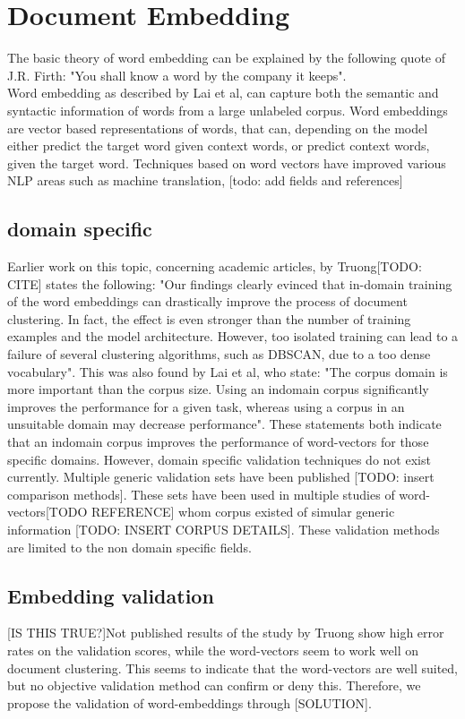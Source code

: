 \documentclass[../../Thesis.tex]{subfiles}
\begin{document}
\section{Document Embedding}
The basic theory of word embedding can be explained by the following quote of J.R. Firth: "You shall know a word by the company it keeps". \\
Word embedding as described by Lai et al, can capture both the semantic and syntactic
information of words from a large unlabeled corpus.\cite{lai2016generate} Word embeddings are vector based representations of words, that can, depending on the model either predict the target word given context words, or predict context words, given the target word. Techniques based on word vectors have improved various NLP areas such as machine translation, [todo: add fields and references]

\subsection{domain specific}
Earlier work on this topic, concerning academic articles, by Truong[TODO: CITE] states the following: "Our findings clearly evinced that in-domain training of the
word embeddings can drastically improve the process of document clustering. In fact, the
effect is even stronger than the number of training examples and the model architecture.
However, too isolated training can lead to a failure of several clustering algorithms, such
as DBSCAN, due to a too dense vocabulary". This was also found by Lai et al, who state: "The corpus domain is more important than the corpus size. Using an indomain corpus significantly improves the performance for a given task, whereas using a corpus in an unsuitable domain may decrease performance". These statements both indicate that an indomain corpus improves the performance of word-vectors for those specific domains. However, domain specific validation techniques do not exist currently. Multiple generic validation sets have been published [TODO: insert comparison methods]. These sets have been used in multiple studies of word-vectors[TODO REFERENCE] whom corpus existed of simular generic information [TODO: INSERT CORPUS DETAILS]. These validation methods are limited to the non domain specific fields. 
\subsection{Embedding validation}[IS THIS TRUE?]Not published results of the study by Truong show high error rates on the validation scores, while the word-vectors seem to work well on document clustering. This seems to indicate that the word-vectors are well suited, but no objective validation method can confirm or deny this. Therefore, we propose the validation of word-embeddings through [SOLUTION].
\end{document}
